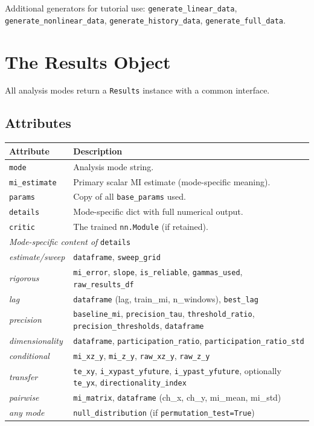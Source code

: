 \documentclass[12pt]{article}
\newcommand{\api}[1]{\texttt{#1}}
\begin{document}
Additional generators for tutorial use:
\api{generate\_linear\_data}, \api{generate\_nonlinear\_data},
\api{generate\_history\_data}, \api{generate\_full\_data}.

\section{The Results Object}
\label{sec:results}

All analysis modes return a \api{Results} instance with a common interface.

\subsection{Attributes}

\begin{center}
\begin{tabular}{lp{9cm}}
\toprule
\textbf{Attribute} & \textbf{Description} \\
\midrule
\api{mode} & Analysis mode string. \\
\api{mi\_estimate} & Primary scalar MI estimate (mode-specific meaning). \\
\api{params} & Copy of all \api{base\_params} used. \\
\api{details} & Mode-specific dict with full numerical output. \\
\api{critic} & The trained \api{nn.Module} (if retained). \\
\midrule
\multicolumn{2}{l}{\textit{Mode-specific content of} \api{details}} \\
\midrule
\textit{estimate/sweep} & \api{dataframe}, \api{sweep\_grid} \\
\textit{rigorous} & \api{mi\_error}, \api{slope}, \api{is\_reliable}, \api{gammas\_used}, \api{raw\_results\_df} \\
\textit{lag}      & \api{dataframe} (lag, train\_mi, n\_windows), \api{best\_lag} \\
\textit{precision} & \api{baseline\_mi}, \api{precision\_tau}, \api{threshold\_ratio},
                     \api{precision\_thresholds}, \api{dataframe} \\
\textit{dimensionality} & \api{dataframe}, \api{participation\_ratio},
                          \api{participation\_ratio\_std} \\
\textit{conditional} & \api{mi\_xz\_y}, \api{mi\_z\_y}, \api{raw\_xz\_y}, \api{raw\_z\_y} \\
\textit{transfer} & \api{te\_xy}, \api{i\_xypast\_yfuture}, \api{i\_ypast\_yfuture},
                    optionally \api{te\_yx}, \api{directionality\_index} \\
\textit{pairwise} & \api{mi\_matrix}, \api{dataframe} (ch\_x, ch\_y, mi\_mean, mi\_std) \\
\textit{any mode}  & \api{null\_distribution} (if \api{permutation\_test=True}) \\
\bottomrule
\end{tabular}
\end{center}
\end{document}
